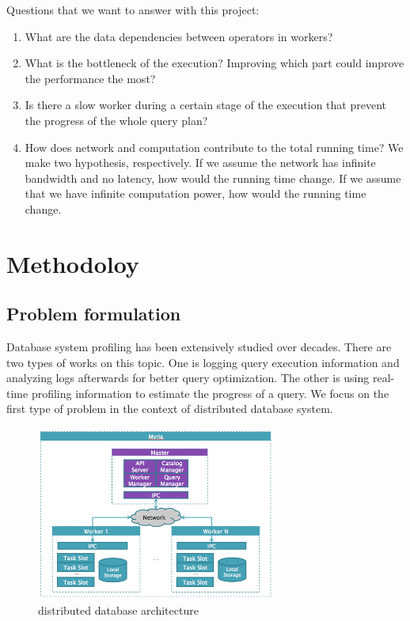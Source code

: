 \documentclass[11pt]{article}
\begin{document}
\noindent Questions that we want to answer with this project:

\begin{enumerate}
	\item What are the data dependencies between operators in workers?
	\item What is the bottleneck of the execution? Improving which part could improve the performance the most?
	\item Is there a slow worker during a certain stage of the execution that prevent the progress of the whole query plan?
	\item How does network and computation contribute to the total running time? We make two hypothesis, respectively. If we assume the network has infinite bandwidth and no latency, how would the running time change. If we assume that we have infinite computation power, how would the running time change.

\end{enumerate}

\section{Methodoloy}
\subsection{Problem formulation}
\label{sec:formulation}

Database system profiling has been extensively studied over decades. There are two types of works on this topic. One is logging query execution information and analyzing logs afterwards for better query optimization. The other is using real-time profiling information to estimate the progress of a query. We focus on the first type of problem in the context of distributed database system.

\begin{figure}
 \begin{center}
     \includegraphics[width=0.7\textwidth]{myria.png}
   \end{center}
  \caption{distributed database architecture}
  \label{fig:myria_arc}
\end{figure}
\end{document}
